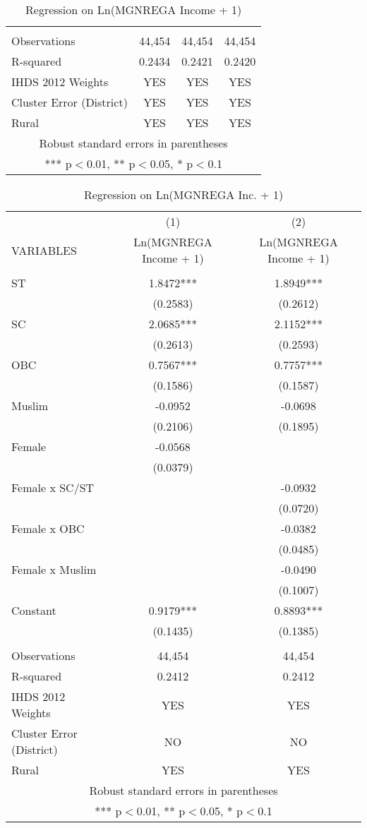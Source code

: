 \documentclass{article}
\begin{document}
\begin{landscape}
\begin{table}[]
\begin{tabular}{lccc}
 &  &  &  \\
Observations & 44,454 & 44,454 & 44,454 \\
 R-squared & 0.2434 & 0.2421 & 0.2420 \\ 
   IHDS 2012 Weights & YES & YES & YES \\
Cluster Error (District) & YES & YES & YES \\
Rural & YES & YES & YES \\\hline
\multicolumn{4}{c}{ Robust standard errors in parentheses} \\
\multicolumn{4}{c}{ *** p$<$0.01, ** p$<$0.05, * p$<$0.1} \\
\end{tabular}
    \caption{Regression on Ln(MGNREGA Income + 1)}
    \label{tabB}
\end{table}
\end{landscape}

\begin{table}[]
    \centering
    \begin{tabular}{lcc} \hline
 & (1) & (2) \\
VARIABLES & Ln(MGNREGA Income + 1) & Ln(MGNREGA Income + 1) \\ \hline
 &  &  \\
ST & 1.8472*** & 1.8949*** \\
 & (0.2583) & (0.2612) \\
SC & 2.0685*** & 2.1152*** \\
 & (0.2613) & (0.2593) \\
OBC & 0.7567*** & 0.7757*** \\
 & (0.1586) & (0.1587) \\
Muslim & -0.0952 & -0.0698 \\
 & (0.2106) & (0.1895) \\
Female & -0.0568 &  \\
 & (0.0379) &  \\
Female x SC/ST &  & -0.0932 \\
 &  & (0.0720) \\
Female x OBC &  & -0.0382 \\
 &  & (0.0485) \\
Female x Muslim &  & -0.0490 \\
 &  & (0.1007) \\

Constant & 0.9179*** & 0.8893*** \\
 & (0.1435) & (0.1385) \\
 &  &  \\
Observations & 44,454 & 44,454 \\
 R-squared & 0.2412 & 0.2412 \\ 
 IHDS 2012 Weights & YES & YES\\
Cluster Error (District) & NO & NO\\
Rural & YES & YES\\\hline
\multicolumn{3}{c}{ Robust standard errors in parentheses} \\
\multicolumn{3}{c}{ *** p$<$0.01, ** p$<$0.05, * p$<$0.1} \\
\end{tabular}
    \caption{Regression on Ln(MGNREGA Inc. + 1)}
    \label{tabC}
\end{table}
\end{document}
